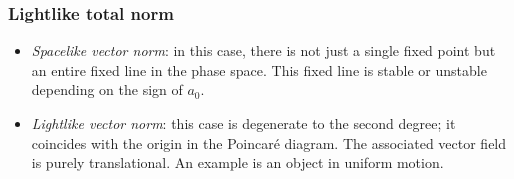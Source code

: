 \subsubsection*{Lightlike total norm}
    \begin{itemize}
        \item[\circled{2}] \emph{Spacelike vector norm}: in this case, there is not just a single fixed point but an entire fixed line in the phase space. This fixed line is stable or unstable depending on the sign of $a_0$. 
        \item[\circled{3}] \emph{Lightlike vector norm}: this case is degenerate to the second degree; it coincides with the origin in the Poincaré diagram. The associated vector field is purely translational. An example is an object in uniform motion.
    \end{itemize}
